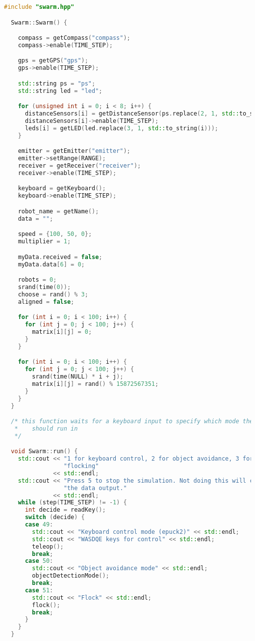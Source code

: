 \begin{lstlisting}[language=C++, caption={swarm.cpp},label={lst:swarm-header}]
  #include "swarm.hpp"

  Swarm::Swarm() {

    compass = getCompass("compass");
    compass->enable(TIME_STEP);

    gps = getGPS("gps");
    gps->enable(TIME_STEP);

    std::string ps = "ps";
    std::string led = "led";

    for (unsigned int i = 0; i < 8; i++) {
      distanceSensors[i] = getDistanceSensor(ps.replace(2, 1, std::to_string(i)));
      distanceSensors[i]->enable(TIME_STEP);
      leds[i] = getLED(led.replace(3, 1, std::to_string(i)));
    }

    emitter = getEmitter("emitter");
    emitter->setRange(RANGE);
    receiver = getReceiver("receiver");
    receiver->enable(TIME_STEP);

    keyboard = getKeyboard();
    keyboard->enable(TIME_STEP);

    robot_name = getName();
    data = "";

    speed = {100, 50, 0};
    multiplier = 1;

    myData.received = false;
    myData.data[6] = 0;

    robots = 0;
    srand(time(0));
    choose = rand() % 3;
    aligned = false;

    for (int i = 0; i < 100; i++) {
      for (int j = 0; j < 100; j++) {
        matrix[i][j] = 0;
      }
    }

    for (int i = 0; i < 100; i++) {
      for (int j = 0; j < 100; j++) {
        srand(time(NULL) * i + j);
        matrix[i][j] = rand() % 15872567351;
      }
    }
  }

  /* this function waits for a keyboard input to specify which mode the simulation
   *    should run in
   */

  void Swarm::run() {
    std::cout << "1 for keyboard control, 2 for object avoidance, 3 for "
                 "flocking"
              << std::endl;
    std::cout << "Press 5 to stop the simulation. Not doing this will corrupt "
                 "the data output."
              << std::endl;
    while (step(TIME_STEP) != -1) {
      int decide = readKey();
      switch (decide) {
      case 49:
        std::cout << "Keyboard control mode (epuck2)" << std::endl;
        std::cout << "WASDQE keys for control" << std::endl;
        teleop();
        break;
      case 50:
        std::cout << "Object avoidance mode" << std::endl;
        objectDetectionMode();
        break;
      case 51:
        std::cout << "Flock" << std::endl;
        flock();
        break;
      }
    }
  }


\end{lstlisting}
